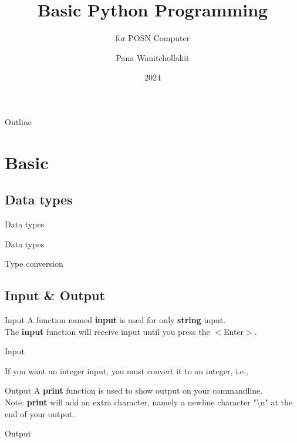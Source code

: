\documentclass{beamer}
\title[Basic Python]{Basic Python Programming}
\subtitle[POSN Computer]{for POSN Computer}
\author[Pana W.]{Pana Wanitchollakit}
\date{2024}
\begin{document}
\frame{\titlepage}

\begin{frame}{Outline}
\end{frame}


\section{Basic}

\subsection[Data types]{Data types}
\begin{frame}{Data types}
    \begin{block}{Data types}
        
    \end{block}
    \begin{block}{Type conversion}
        
    \end{block}
\end{frame}


\subsection[I/O]{Input \& Output}
\begin{frame}{Input}
    A function named \textbf{input} is used for only \textbf{string} input. \\
    The \textbf{input} function will receive input until you press the $<$Enter$>$.
    \begin{block}{Input}
        
        If you want an integer input, you must convert it to an integer, i.e.,
        
    \end{block}
\end{frame}

\begin{frame}{Output}
    A \textbf{print} function is used to show output on your commandline. \\
    Note: \textbf{print} will add an extra character, namely a newline character "\textbackslash n" at the end of your output.
    \begin{block}{Output}
        
    \end{block}
\end{frame}
\end{document}

